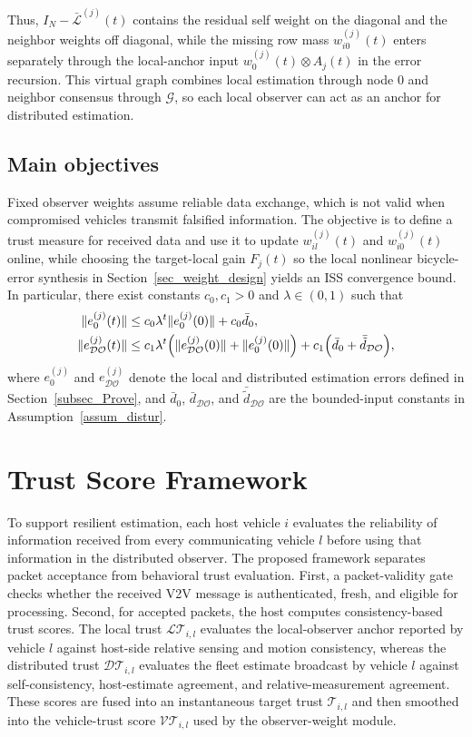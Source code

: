 \documentclass[letterpaper,journal]{IEEEtran}
\def\G{\mathcal{G}} %
\def\L{\mathcal{L}} %
\def\DO{\mathcal{DO}} %
\def\LT{\mathcal{LT}} %
\def\DT{\mathcal{DT}} %
\def\VT{\mathcal{VT}} %
\def\T{\mathcal{T}} %
\begin{document}
    Thus, $I_N-\bar{\L}^{(j)}(t)$ contains the residual self weight on the diagonal and the neighbor weights off diagonal, while the missing row mass $w_{i0}^{(j)}(t)$ enters separately through the local-anchor input $w_0^{(j)}(t)\otimes A_j(t)$ in the error recursion. This virtual graph combines local estimation through node $0$ and neighbor consensus through $\G$, so each local observer can act as an anchor for distributed estimation.

\subsection{Main objectives}
Fixed observer weights assume reliable data exchange, which is not valid when compromised vehicles transmit falsified information. The objective is to define a trust measure for received data and use it to update $w_{il}^{(j)}(t)$ and $w_{i0}^{(j)}(t)$ online, while choosing the target-local gain $F_j(t)$ so the local nonlinear bicycle-error synthesis in Section~\ref{sec_weight_design} yields an ISS convergence bound. In particular, there exist constants $c_0, c_1 > 0$ and $\lambda \in (0,1)$ such that
\begin{align}
\|e_0^{(j)}(t)\| &\le c_0\lambda^t \|e_0^{(j)}(0)\| + c_0 \bar{d}_0,\label{eq_iss_e0}\\
\|e_{\DO}^{(j)}(t)\| &\le c_1\lambda^t
\Big(\|e_{\DO}^{(j)}(0)\|+\|e_0^{(j)}(0)\|\Big)\notag
+c_1\Big(\bar d_0+\bar{\tilde d}_{\DO}\Big),\label{eq_iss_edo}
\end{align}
where $e_0^{(j)}$ and $e_{\DO}^{(j)}$ denote the local and distributed estimation errors defined in Section~\ref{subsec_Prove}, and $\bar{d}_0$, $\bar{d}_{\DO}$, and $\bar{\tilde{d}}_{\DO}$ are the bounded-input constants in Assumption~\ref{assum_distur}.


\section{Trust Score Framework}\label{sec_trust_score}

To support resilient estimation, each host vehicle $i$ evaluates the reliability of information received from every communicating vehicle $l$ before using that information in the distributed observer. The proposed framework separates packet acceptance from behavioral trust evaluation. First, a packet-validity gate checks whether the received V2V message is authenticated, fresh, and eligible for processing. Second, for accepted packets, the host computes consistency-based trust scores. The local trust $\LT_{i,l}$ evaluates the local-observer anchor reported by vehicle $l$ against host-side relative sensing and motion consistency, whereas the distributed trust $\DT_{i,l}$ evaluates the fleet estimate broadcast by vehicle $l$ against self-consistency, host-estimate agreement, and relative-measurement agreement. These scores are fused into an instantaneous target trust $\T_{i,l}$ and then smoothed into the vehicle-trust score $\VT_{i,l}$ used by the observer-weight module.
\end{document}

